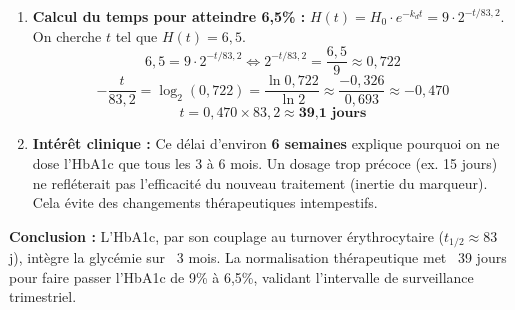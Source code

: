 \documentclass[11pt]{article}
\begin{document}
\begin{exoresolu}
\begin{enumerate}
    \item \textbf{Calcul du temps pour atteindre 6,5\% :}
    $H(t) = H_0 \cdot e^{-k_d t} = 9 \cdot 2^{-t / 83{,}2}$.
    On cherche $t$ tel que $H(t) = 6{,}5$.
    \[ 6{,}5 = 9 \cdot 2^{-t / 83{,}2} \iff 2^{-t / 83{,}2} = \frac{6{,}5}{9} \approx 0{,}722 \]
    \[ -\frac{t}{83{,}2} = \log_2(0{,}722) = \frac{\ln 0{,}722}{\ln 2} \approx \frac{-0{,}326}{0{,}693} \approx -0{,}470 \]
    \[ t = 0{,}470 \times 83{,}2 \approx \textbf{39{,}1 jours} \]
    \item \textbf{Intérêt clinique :} Ce délai d'environ \textbf{6 semaines} explique pourquoi on ne dose l'HbA1c que tous les 3 à 6 mois. Un dosage trop précoce (ex. 15 jours) ne refléterait pas l'efficacité du nouveau traitement (inertie du marqueur). Cela évite des changements thérapeutiques intempestifs.
\end{enumerate}
\textbf{Conclusion :} L'HbA1c, par son couplage au turnover érythrocytaire ($t_{1/2} \approx 83$ j), intègre la glycémie sur ~3 mois. La normalisation thérapeutique met ~39 jours pour faire passer l'HbA1c de 9\% à 6,5\%, validant l'intervalle de surveillance trimestriel.
\end{exoresolu}
\end{document}
